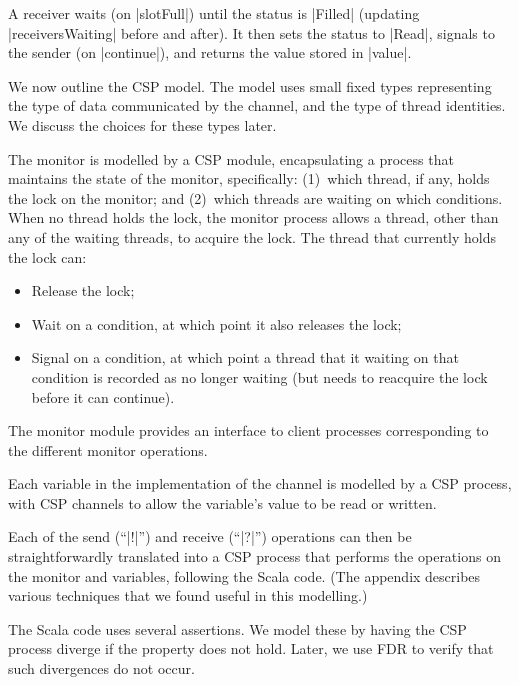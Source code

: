 A receiver waits (on |slotFull|) until the status is |Filled| (updating
|receiversWaiting| before and after).  It then sets the status to |Read|,
signals to the sender (on |continue|), and returns the value stored in
|value|.

We now outline the CSP model.  The model uses small fixed types representing
the type of data communicated by the channel, and the type of thread
identities.  We discuss the choices for these types later. 

The monitor is modelled by a CSP module, encapsulating a process that
maintains the state of the monitor, specifically: (1)~which thread, if any,
holds the lock on the monitor; and (2)~which threads are waiting on which
conditions.  When no thread holds the lock, the monitor process allows a
thread, other than any of the waiting threads, to acquire the lock.  The
thread that currently holds the lock can:
\begin{itemize}
\item Release the lock;
\item Wait on a condition, at which point it also releases the lock;
\item Signal on a condition, at which point a thread that it waiting on that
  condition is recorded as no longer waiting (but needs to reacquire the lock
  before it can continue).
\end{itemize}
%
The monitor module provides an interface to client processes corresponding to
the different monitor operations.

Each variable in the implementation of the channel is modelled by a CSP
process, with CSP channels to allow the variable's value to be read or
written.

Each of the send (``|!|'') and receive (``|?|'') operations can then be
straightforwardly translated into a CSP process that performs the operations
on the monitor and variables, following the Scala code.  (The appendix
describes various techniques that we found useful in this modelling.)

The Scala code uses several assertions.  We model these by having the CSP
process diverge if the property does not hold.  Later, we use FDR to verify
that such divergences do not occur.  

